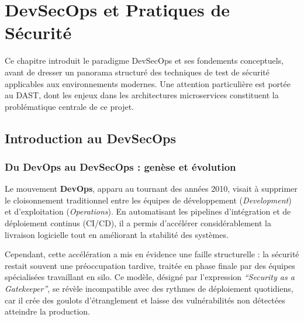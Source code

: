 \chapter{DevSecOps et Pratiques de Sécurité}

\begin{tcolorbox}[
  colback=gray!8, colframe=darkgray,
  arc=4pt, boxrule=0.6pt
]
  Ce chapitre introduit le paradigme DevSecOps et ses fondements conceptuels,
  avant de dresser un panorama structuré des techniques de test de sécurité
  applicables aux environnements modernes. Une attention particulière est portée
  au DAST, dont les enjeux dans les architectures microservices constituent
  la problématique centrale de ce projet.
\end{tcolorbox}

\section{Introduction au DevSecOps}

\subsection{Du DevOps au DevSecOps : genèse et évolution}

Le mouvement \textbf{DevOps}, apparu au tournant des années 2010, visait à
supprimer le cloisonnement traditionnel entre les équipes de développement
(\textit{Development}) et d'exploitation (\textit{Operations}). En automatisant
les pipelines d'intégration et de déploiement continus (CI/CD), il a permis
d'accélérer considérablement la livraison logicielle tout en améliorant la
stabilité des systèmes.

Cependant, cette accélération a mis en évidence une faille structurelle : la
sécurité restait souvent une préoccupation tardive, traitée en phase finale
par des équipes spécialisées travaillant en silo. Ce modèle, désigné par
l'expression \textit{``Security as a Gatekeeper''}, se révèle incompatible
avec des rythmes de déploiement quotidiens, car il crée des goulots d'étranglement
et laisse des vulnérabilités non détectées atteindre la production.

